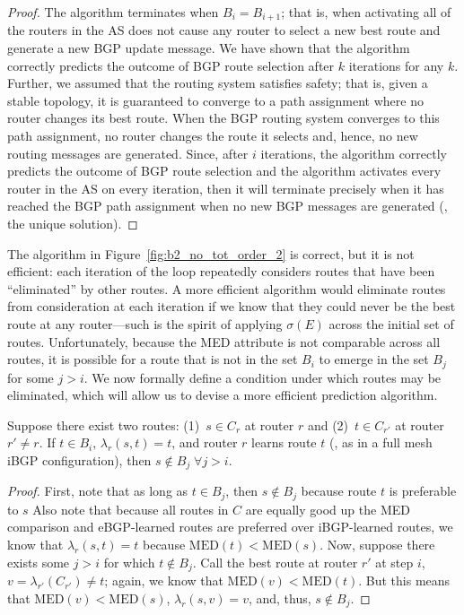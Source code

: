 \begin{proof}
The algorithm terminates when $B_i = B_{i+1}$; that is, when activating
all of the routers in the AS does not cause any router to select a new
best route and generate a new BGP update message.
%
We have shown that the algorithm correctly predicts the outcome of BGP
route selection after $k$ iterations for any $k$.  Further, we assumed
that the routing system satisfies safety; that is, given a stable
topology, it is guaranteed to converge to a path assignment where no
router changes its best route.  When the BGP routing system converges to
this path assignment, no router changes the route it selects and, hence,
no new routing messages are generated.  Since, after $i$ iterations, the
algorithm correctly predicts the outcome of BGP route selection and the
algorithm activates every router in the AS on every iteration, then it
will terminate precisely when it has reached the BGP path assignment
when no new BGP messages are generated (\ie, the unique solution).
\end{proof}

The algorithm in Figure~\ref{fig:b2_no_tot_order_2} is correct, but it
is not efficient: each iteration of the loop repeatedly considers routes
that have been ``eliminated'' by other routes.  A more efficient
algorithm would eliminate routes from consideration at each iteration if
we know that they could never be the best route at any router---such is
the spirit of applying $\sigma(E)$ across the initial set of routes.
Unfortunately, because the MED attribute is not comparable across all
routes, it is possible for a route that is not in the set $B_i$ to
emerge in the set $B_j$ for some $j>i$.  We now formally define a
condition under which routes may be eliminated, which will allow us to
devise a more efficient prediction algorithm.

\begin{lemma}\label{l:elim}
Suppose there exist two routes: (1)~$s \in C_r$ at router $r$ and (2)~$t
\in C_{r'}$ at router $r'\neq r$.  If $t\in B_i$, $\lambda_r(s,t) = t$,
and router $r$ learns route $t$ (\eg, as in a full mesh iBGP
configuration), then $s\not\in B_j \; \forall j > i$.
\end{lemma}

\begin{proof}
First, note that as long as $t \in B_j$, then $s \not\in B_j$
because route $t$ is preferable to $s$
Also note that because all routes in $C$ are equally
good up the MED comparison and eBGP-learned routes are preferred over
iBGP-learned routes, we know that $\lambda_r(s,t) = t$ because
$\mbox{MED}(t) < \mbox{MED}(s)$.  
Now,
suppose there exists some $j > i$ for which $t \not\in B_j$.  
Call the best route at router $r'$ at
step $i$, $v = \lambda_{r'}(C_{r'}) \neq t$; again, we know that
$\mbox{MED}(v) < \mbox{MED}(t)$.  But this means that $\mbox{MED}(v) <
\mbox{MED}(s)$, $\lambda_r(s,v) = v$, and, thus, $s \not\in B_j$.
\end{proof}

